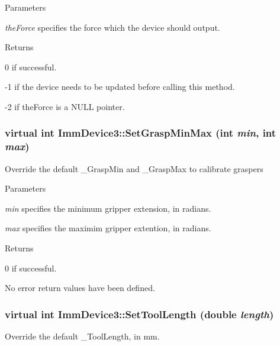 \begin{DoxyParams}{Parameters}
\item[{\em theForce}]specifies the force which the device should output.\end{DoxyParams}
\begin{DoxyReturn}{Returns}

\end{DoxyReturn}
0 if successful.

-\/1 if the device needs to be updated before calling this method.

-\/2 if theForce is a NULL pointer. \hypertarget{classImmDevice3_a6755cfaeadbc6edb60a19cdf28defa1e}{
\subsubsection[{SetGraspMinMax}]{\setlength{\rightskip}{0pt plus 5cm}virtual int ImmDevice3::SetGraspMinMax (int {\em min}, \/  int {\em max})}}
\label{classImmDevice3_a6755cfaeadbc6edb60a19cdf28defa1e}
Override the default \_\-GraspMin and \_\-GraspMax to calibrate graspers


\begin{DoxyParams}{Parameters}
\item[{\em min}]specifies the minimum gripper extension, in radians.\item[{\em max}]specifies the maximim gripper extention, in radians.\end{DoxyParams}
\begin{DoxyReturn}{Returns}

\end{DoxyReturn}
0 if successful.

No error return values have been defined. \hypertarget{classImmDevice3_a1b48e98f281a0c887ece409e3a00b344}{
\subsubsection[{SetToolLength}]{\setlength{\rightskip}{0pt plus 5cm}virtual int ImmDevice3::SetToolLength (double {\em length})}}
\label{classImmDevice3_a1b48e98f281a0c887ece409e3a00b344}
Override the default \_\-ToolLength, in mm.


